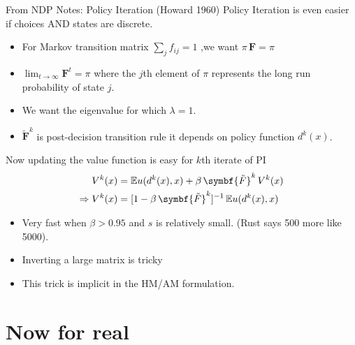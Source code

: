 \begin{frame}{From NDP Notes:  Policy Iteration (Howard 1960)}
\footnotesize
Policy Iteration is even easier if choices AND states are discrete.
\begin{itemize}
\item For Markov transition matrix $\sum_j f_{ij} =1$ ,we want $\pi \, \symbf{F} = \pi$
\item $\lim_{t \rightarrow \infty} \symbf{F}^t = \pi$ where the $j$th element of $\pi$ represents the long run probability of state $j$.
\item We want the eigenvalue for which $\lambda = 1$.
\item $\symbf{\tilde{F}}^k$ is \alert{post-decision transition rule} it depends on \alert{policy function} $d^k(x)$.
\end{itemize}
Now updating the value function is easy for $k$th iterate of PI
\begin{align*}
V^k(x) &= \E u(d^k(x),x) + \beta \, \symbf{\tilde{F}}^k \, V^k(x)\\
\Rightarrow V^k(x) &= [1 - \beta \, \symbf{\tilde{F}}^k]^{-1}\, \E u(d^k(x),x)
\end{align*}
\vspace{-.5cm}
\begin{itemize}
\item Very fast when $\beta > 0.95$ and $s$ is relatively small. (Rust says 500 more like 5000).
\item Inverting a large matrix is tricky
\item \alert{This trick is implicit in the HM/AM formulation}.
\end{itemize}
\end{frame}


\section*{Now for real}


